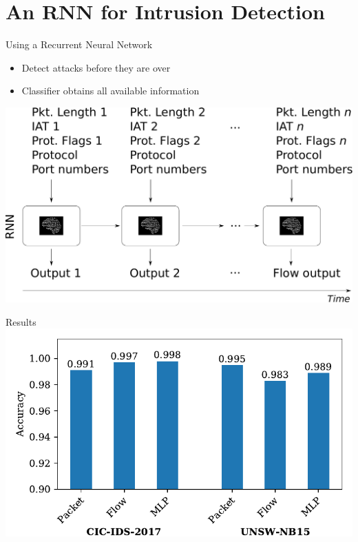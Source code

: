 \documentclass{beamer}
\begin{document}
\section{An RNN for Intrusion Detection}
\begin{frame}{Using a Recurrent Neural Network}
\begin{itemize}
\item Detect attacks before they are over
\item Classifier obtains all available information
\end{itemize}
\vspace{10pt}
\centering
\includegraphics[width=0.8\columnwidth]{figures/rnn.pdf}
\end{frame}


\begin{frame}{Results}
\includegraphics[width=\columnwidth]{figures/results.pdf}
\end{frame}
\end{document}
